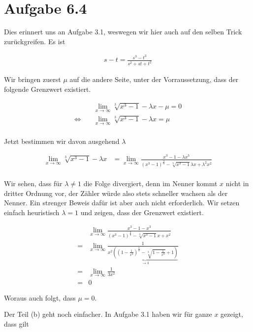 \documentclass[a4paper,german,12pt,smallheadings]{scrartcl}
\begin{document}
\section*{Aufgabe 6.4}

Dies erinnert uns an Aufgabe 3.1, weswegen wir hier auch auf den selben Trick
zurückgreifen. Es ist

\begin{align*}
  s - t = \frac{s^3 - t^3}{s^2 + st + t^2}
\end{align*}

Wir bringen zuerst $\mu$ auf die andere Seite, unter der Vorraussetzung, dass
der folgende Grenzwert existiert.

\begin{align*}
  &\lim_{x \to \infty} \sqrt[3]{x^3 - 1} - \lambda x - \mu = 0\\
  \Leftrightarrow\quad&\lim_{x \to \infty} \sqrt[3]{x^3 - 1} - \lambda x = \mu \\
\end{align*}

Jetzt bestimmen wir davon ausgehend $\lambda$

\begin{align*}
  \lim_{x \to \infty} \sqrt[3]{x^3 - 1} - \lambda x &= \lim_{x \to \infty} \frac{x^3 - 1 - \lambda x^3}{(x^3 - 1)^\frac{2}{3} - \sqrt[3]{x^3 - 1}\lambda x + \lambda^2 x^2} \\
\end{align*}

Wir sehen, dass für $\lambda \neq 1$ die Folge divergiert, denn im Nenner kommt
$x$ nicht in dritter Ordnung vor, der Zähler würde also stets schneller wachsen
als der Nenner. Ein strenger Beweis dafür ist aber auch nicht erforderlich. Wir
setzen einfach heuristisch $\lambda = 1$ und zeigen, dass der Grenzwert
existiert.

\begin{align*}
  &\lim_{x \to \infty} \frac{x^3 - 1 - x^3}{(x^3 - 1)^\frac{2}{3} - \sqrt[3]{x^3 - 1}x + x^2} \\
  =&\lim_{x \to \infty} \frac{1}{x^2 \underbrace{\left(\left(1 - \frac{1}{x^3}\right)^\frac{2}{3} - \sqrt[3]{1 - \frac{1}{x^3}} + 1\right)}_{\to 3}} \\
  =&\lim_{x \to \infty} \frac{1}{3x^2} \\
  =& 0
\end{align*}

Woraus auch folgt, dass $\mu = 0$.

Der Teil (b) geht noch einfacher. In Aufgabe 3.1 haben wir für ganze $x$
gezeigt, dass gilt
\end{document}
